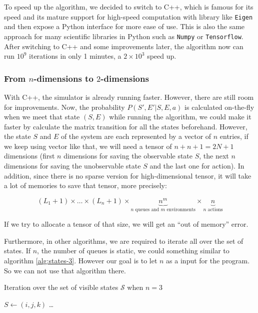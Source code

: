 \documentclass[
  a4paper, xcolor = usenames,dvipsnames]{article}
\newcommand{\passthrough}[1]{#1}
\begin{document}
To speed up the algorithm, we decided to switch to C++, which is famous for its speed and its mature support for high-speed computation with library like \passthrough{\lstinline!Eigen!} and then expose a Python interface for more ease of use. This is also the same approach for many scientific libraries in Python such as \passthrough{\lstinline!Numpy!} or \passthrough{\lstinline!Tensorflow!}. After switching to C++ and some improvements later, the algorithm now can run \(10^9\) iterations in only 1 minutes, a \(2 \times 10^3\) speed up.

\hypertarget{from-n-dimensions-to-2-dimensions}{%
\subsubsection{\texorpdfstring{From \(n\)-dimensions to \(2\)-dimensions}{From n-dimensions to 2-dimensions}}\label{from-n-dimensions-to-2-dimensions}}

With C++, the simulator is already running faster. However, there are still room for improvements. Now, the probability \(P(S', E' | S, E, a)\) is calculated on-the-fly when we meet that state \((S, E)\) while running the algorithm, we could make it faster by calculate the matrix transition for all the states beforehand. However, the state \(S\) and \(E\) of the system are each represented by a vector of \(n\) entries, if we keep using vector like that, we will need a tensor of \(n + n + 1 = 2N + 1\) dimensions (first \(n\) dimensions for saving the observable state \(S\), the next \(n\) dimensions for saving the unobservable state \(S\) and the last one for action). In addition, since there is no sparse version for high-dimensional tensor, it will take a lot of memories to save that tensor, more precisely:

\[
(L_{1} + 1) \times \dots \times (L_{n} + 1) \times \underbrace{n^{m}}_{n \text{ queues and } m \text{ environments}} \times \underbrace{n}_{n \text{ actions}}
\]

If we try to allocate a tensor of that size, we will get an ``out of memory'' error.

Furthermore, in other algorithms, we are required to iterate all over the set of states. If \(n\), the number of queues is static, we could something similar to algorithm \ref{alg:states-3}. However our goal is to let \(n\) as a input for the program. So we can not use that algorithm there.

\begin{algorithm}
\caption{Iteration over the set of visible states $\mathcal{S}$ when $n = 3$} \label{alg:states-3}
 {
   {
     {
      $S \gets (i, j, k)$\;
      \dots\;
    }
  }
}
\end{algorithm}
\end{document}
